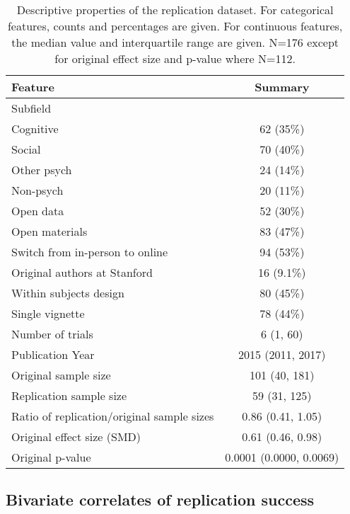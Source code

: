 \documentclass[
  english,
  a4paper,
]{article}
\begin{document}
\begin{table}[!h]

\caption{\label{tab:unnamed-chunk-6}Descriptive properties of the replication dataset. For categorical features, counts and percentages are given. For continuous features, the median value and interquartile range are given. N=176 except for original effect size and p-value where N=112. }
\centering
\fontsize{10}{12}\selectfont
\begin{tabular}[t]{lc}
\toprule
Feature & Summary\\
\midrule
Subfield & \\
\hspace{1em}Cognitive & 62 (35\%)\\
\hspace{1em}Social & 70 (40\%)\\
\hspace{1em}Other psych & 24 (14\%)\\
\hspace{1em}Non-psych & 20 (11\%)\\
Open data & 52 (30\%)\\
Open materials & 83 (47\%)\\
Switch from in-person to online & 94 (53\%)\\
Original authors at Stanford & 16 (9.1\%)\\
Within subjects design & 80 (45\%)\\
Single vignette & 78 (44\%)\\
Number of trials & 6 (1, 60)\\
Publication Year & 2015 (2011, 2017)\\
Original sample size & 101 (40, 181)\\
Replication sample size & 59 (31, 125)\\
Ratio of replication/original sample sizes & 0.86 (0.41, 1.05)\\
Original effect size (SMD) & 0.61 (0.46, 0.98)\\
Original p-value & 0.0001 (0.0000, 0.0069)\\
\bottomrule
\end{tabular}
\end{table}

\hypertarget{bivariate-correlates-of-replication-success}{%
\subsection{Bivariate correlates of replication success}\label{bivariate-correlates-of-replication-success}}
\end{document}
